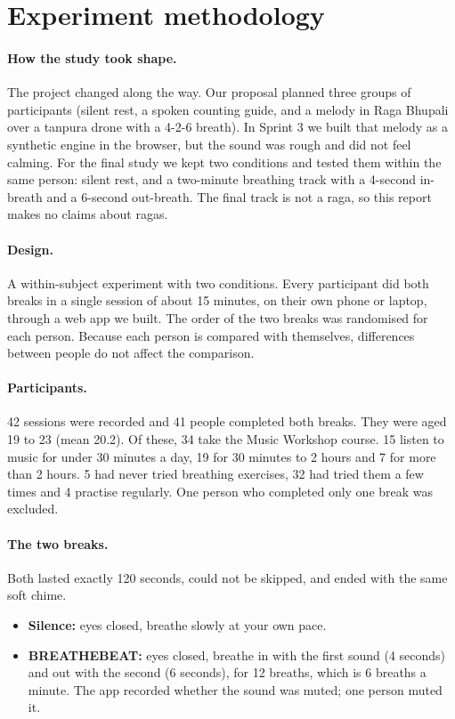 \documentclass[11pt,a4paper]{article}
\begin{document}
\section{Experiment methodology}
\paragraph{How the study took shape.} The project changed along the way. Our proposal planned three groups of participants (silent rest, a spoken counting guide, and a melody in Raga Bhupali over a tanpura drone with a 4-2-6 breath). In Sprint 3 we built that melody as a synthetic engine in the browser, but the sound was rough and did not feel calming. For the final study we kept two conditions and tested them within the same person: silent rest, and a two-minute breathing track with a 4-second in-breath and a 6-second out-breath. The final track is not a raga, so this report makes no claims about ragas.
\paragraph{Design.} A within-subject experiment with two conditions. Every participant did both breaks in a single session of about 15 minutes, on their own phone or laptop, through a web app we built. The order of the two breaks was randomised for each person. Because each person is compared with themselves, differences between people do not affect the comparison.

\paragraph{Participants.} 42 sessions were recorded and 41 people completed both breaks. They were aged 19 to 23 (mean 20.2). Of these, 34 take the Music Workshop course. 15 listen to music for under 30 minutes a day, 19 for 30 minutes to 2 hours and 7 for more than 2 hours. 5 had never tried breathing exercises, 32 had tried them a few times and 4 practise regularly. One person who completed only one break was excluded.

\paragraph{The two breaks.} Both lasted exactly 120 seconds, could not be skipped, and ended with the same soft chime.
\begin{itemize}
\item \textbf{Silence:} eyes closed, breathe slowly at your own pace.
\item \textbf{BREATHEBEAT:} eyes closed, breathe in with the first sound (4 seconds) and out with the second (6 seconds), for 12 breaths, which is 6 breaths a minute. The app recorded whether the sound was muted; one person muted it.
\end{itemize}
\end{document}
